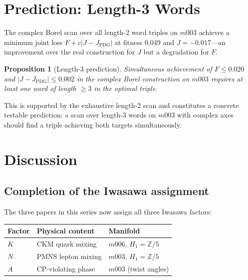 \documentclass[11pt,a4paper]{article}
\newtheorem{proposition}{Proposition}
\begin{document}
\section{Prediction: Length-3 Words}
\label{sec:length3}

The complex Borel scan over all length-2 word triples on $m003$
achieves a minimum joint loss $F + c|J - J_{\mathrm{PDG}}|$ at
fitness $0.049$ and $J = -0.017$---an improvement over the real
construction for $J$ but a degradation for $F$.

\begin{proposition}[Length-3 prediction]
\label{prop:length3}
Simultaneous achievement of $F \leq 0.020$ and
$|J - J_{\mathrm{PDG}}| \leq 0.002$ in the complex Borel
construction on $m003$ requires at least one word of length $\geq 3$
in the optimal triple.
\end{proposition}

This is supported by the exhaustive length-2 scan and constitutes a
concrete testable prediction: a scan over length-3 words on $m003$
with complex axes should find a triple achieving both targets
simultaneously.

\section{Discussion}
\label{sec:discussion}

\subsection{Completion of the Iwasawa assignment}
\label{subsec:completion}

The three papers in this series now assign all three Iwasawa factors:

\begin{center}
\begin{tabular}{lll}
\toprule
Factor & Physical content & Manifold \\
\midrule
$K$ & CKM quark mixing   & $m006$, $H_1 = \mathbb{Z}/5$ \\
$N$ & PMNS lepton mixing  & $m003$, $H_1 = \mathbb{Z}/5$ \\
$A$ & CP-violating phase  & $m003$ (twist angles) \\
\bottomrule
\end{tabular}
\end{center}
\end{document}
